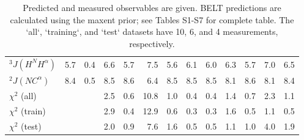 \documentclass[12pt]{article}
\begin{document}
\begin{table}
\begin{tabular}{lrrrrrrrrrrrr}
$^3J(H^NH^\alpha)$     &  5.7 &          0.4 &      6.6 &             5.7 &      7.5 &             5.6 &                6.1 &                       6.0 &       6.3 &              5.7 &     7.0 &            6.5 \\
$^2J(NC^\alpha)$      &  8.4 &          0.5 &      8.5 &             8.6 &      6.4 &             8.5 &                8.5 &                       8.5 &       8.1 &              8.6 &     8.1 &            8.4 \\
$\chi^2$ (all)                           &    &            &      2.5 &             0.6 &     10.8 &             1.0 &                0.4 &                       0.4 &       1.4 &              0.7 &     2.3 &            1.1 \\
$\chi^2$ (train)                         &    &            &      2.9 &             0.4 &     12.9 &             0.6 &                0.3 &                       0.3 &       1.6 &              0.5 &     1.1 &            0.5 \\
$\chi^2$ (test)                          &    &            &      2.0 &             0.9 &      7.6 &             1.6 &                0.5 &                       0.5 &       1.1 &              1.0 &     4.0 &            1.9 \\
\bottomrule
\end{tabular}
\caption{
Predicted and measured observables are given.  BELT predictions are calculated using the maxent prior; see Tables S1-S7 for complete table.  The `all`, `training`, and `test` datasets have 10, 6, and 4 measurements, respectively.  
}
\label{table:Predictions}
\end{table}

\clearpage




\clearpage




\end{document}
